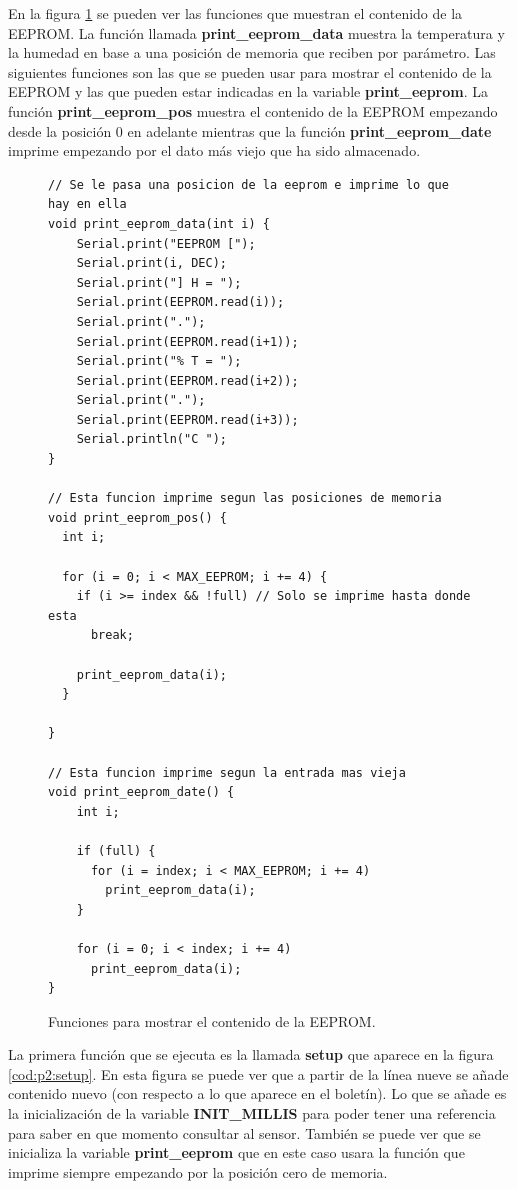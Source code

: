 \documentclass{article}
\begin{document}
	En la figura \ref{cod:p2:print_eeprom} se pueden ver las funciones que muestran el contenido de la EEPROM. La función llamada \textbf{print\_eeprom\_data} muestra la temperatura y la humedad en base a una posición de memoria que reciben por parámetro. Las siguientes funciones son las que se pueden usar para mostrar el contenido de la EEPROM y las que pueden estar indicadas en la variable \textbf{print\_eeprom}. La función \textbf{print\_eeprom\_pos} muestra el contenido de la EEPROM empezando desde la posición 0 en adelante mientras que la función \textbf{print\_eeprom\_date} imprime empezando por el dato más viejo que ha sido almacenado.

\begin{figure}[h]
	\begin{lstlisting}[style=c]
// Se le pasa una posicion de la eeprom e imprime lo que hay en ella
void print_eeprom_data(int i) {
    Serial.print("EEPROM [");
    Serial.print(i, DEC);
    Serial.print("] H = ");
    Serial.print(EEPROM.read(i));
    Serial.print(".");
    Serial.print(EEPROM.read(i+1));
    Serial.print("% T = ");
    Serial.print(EEPROM.read(i+2));
    Serial.print(".");
    Serial.print(EEPROM.read(i+3));
    Serial.println("C ");
}

// Esta funcion imprime segun las posiciones de memoria
void print_eeprom_pos() {
  int i;
 
  for (i = 0; i < MAX_EEPROM; i += 4) {
    if (i >= index && !full) // Solo se imprime hasta donde esta
      break;
      
    print_eeprom_data(i);
  } 
 
}

// Esta funcion imprime segun la entrada mas vieja
void print_eeprom_date() {
    int i;
    
    if (full) {
      for (i = index; i < MAX_EEPROM; i += 4)
        print_eeprom_data(i); 
    }
    
    for (i = 0; i < index; i += 4)
      print_eeprom_data(i);
}
	\end{lstlisting}
	\caption{Funciones para mostrar el contenido de la EEPROM.}
	\label{cod:p2:print_eeprom}
\end{figure}

	La primera función que se ejecuta es la llamada \textbf{setup} que aparece en la figura \ref{cod:p2:setup}. En esta figura se puede ver que a partir de la línea nueve se añade contenido nuevo (con respecto a lo que aparece en el boletín). Lo que se añade es la inicialización de la variable \textbf{INIT\_MILLIS} para poder tener una referencia para saber en que momento consultar al sensor. También se puede ver que se inicializa la variable \textbf{print\_eeprom} que en este caso usara la función que imprime siempre empezando por la posición cero de memoria.
\end{document}
